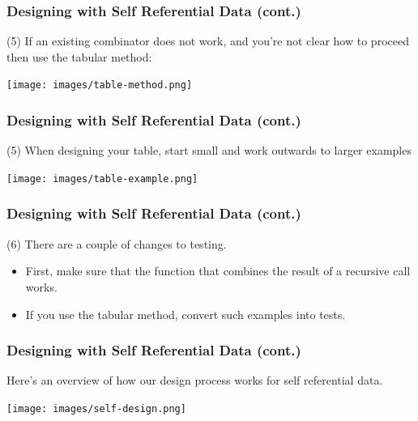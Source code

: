 \documentclass{beamer}
\begin{document}
 \begin{frame}
   \frametitle{Designing with Self Referential Data (cont.)}
   (5) If an existing combinator does not work, and you're not clear how to proceed then use the tabular method:
   \begin{center}
     \texttt{[image: images/table-method.png]}
   \end{center}
   
 \end{frame}

  \begin{frame}
   \frametitle{Designing with Self Referential Data (cont.)}
   (5) When designing your table, start small and work outwards to larger examples
   \begin{center}
     \texttt{[image: images/table-example.png]}
   \end{center}
   
 \end{frame}

 \begin{frame}
   \frametitle{Designing with Self Referential Data (cont.)}
   (6) There are a couple of changes to testing.
   \begin{itemize}
   \item<2-> First, make sure that the function that combines the result of a recursive call works.
   \item<3-> If you use the tabular method, convert such examples into tests. 
   \end{itemize}
 \end{frame}

 \begin{frame}
   \frametitle{Designing with Self Referential Data (cont.)}
   Here's an overview of how our design  process works for self referential data.
   \begin{center}
     \texttt{[image: images/self-design.png]}
   \end{center}
 \end{frame}
\end{document}
